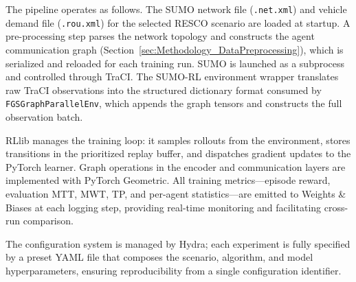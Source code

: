 The pipeline operates as follows. The SUMO network file (\texttt{.net.xml}) and vehicle demand file (\texttt{.rou.xml}) for the selected RESCO scenario are loaded at startup. A pre-processing step parses the network topology and constructs the agent communication graph (Section~\ref{sec:Methodology_DataPreprocessing}), which is serialized and reloaded for each training run. SUMO is launched as a subprocess and controlled through TraCI. The SUMO-RL environment wrapper translates raw TraCI observations into the structured dictionary format consumed by \texttt{FGSGraphParallelEnv}, which appends the graph tensors and constructs the full observation batch.

RLlib manages the training loop: it samples rollouts from the environment, stores transitions in the prioritized replay buffer, and dispatches gradient updates to the PyTorch learner. Graph operations in the encoder and communication layers are implemented with PyTorch Geometric. All training metrics—episode reward, evaluation MTT, MWT, TP, and per-agent statistics—are emitted to Weights \& Biases at each logging step, providing real-time monitoring and facilitating cross-run comparison.

The configuration system is managed by Hydra; each experiment is fully specified by a preset YAML file that composes the scenario, algorithm, and model hyperparameters, ensuring reproducibility from a single configuration identifier.
